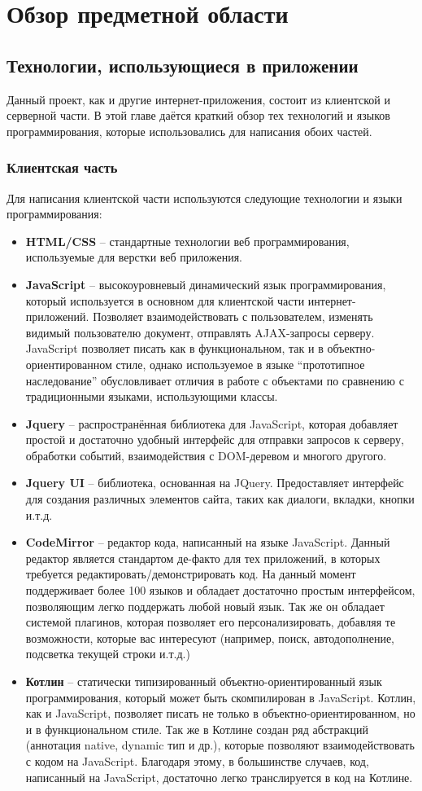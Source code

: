 \chapter{Обзор предметной области}
\section{Технологии, использующиеся в приложении}
	Данный проект, как и другие интернет-приложения,  состоит из клиентской и серверной части. В этой главе даётся краткий обзор тех технологий и языков программирования, которые использовались для написания обоих частей.
\subsection{Клиентская часть}
	Для написания клиентской части используются следующие технологии и языки программирования:
\begin{itemize}
	\item \textbf{HTML/CSS} -- стандартные технологии веб программирования, используемые для верстки веб приложения.
	\item \textbf{JavaScript} -- высокоуровневый динамический язык программирования, который используется в основном для клиентской части интернет-приложений. Позволяет взаимодействовать с пользователем, изменять видимый пользователю документ, отправлять AJAX-запросы серверу. JavaScript позволяет писать как в функциональном, так и в объектно-ориентированном стиле, однако используемое в языке ``прототипное наследование'' обусловливает отличия в работе с объектами по сравнению с традиционными языками, использующими классы.
	\item \textbf{Jquery} -- распространённая библиотека для JavaScript, которая добавляет простой и достаточно удобный интерфейс для отправки запросов к серверу, обработки событий, взаимодействия с DOM-деревом и многого другого.
	\item \textbf{Jquery UI} -- библиотека, основанная на JQuery. Предоставляет интерфейс для создания различных элементов сайта, таких как диалоги, вкладки, кнопки и.т.д.
	\item \textbf{CodeMirror} -- редактор кода, написанный на языке JavaScript. Данный редактор является стандартом де-факто для тех приложений, в которых требуется редактировать/демонстрировать код. На данный момент поддерживает более 100 языков и обладает достаточно простым интерфейсом, позволяющим легко поддержать любой новый язык. Так же он обладает системой плагинов, которая позволяет его персонализировать, добавляя те возможности, которые вас интересуют (например, поиск, автодополнение, подсветка текущей строки и.т.д.)
	\item \textbf{Котлин} -- статически типизированный объектно-ориентированный язык программирования, который может быть скомпилирован в JavaScript. Котлин, как и JavaScript, позволяет писать не только в объектно-ориентированном, но и в функциональном стиле. Так же в Котлине создан ряд абстракций (аннотация native, dynamic тип и др.), которые позволяют взаимодействовать с кодом на JavaScript. Благодаря этому, в большинстве случаев, код, написанный на JavaScript, достаточно легко транслируется в код на Котлине. 
\end{itemize}

